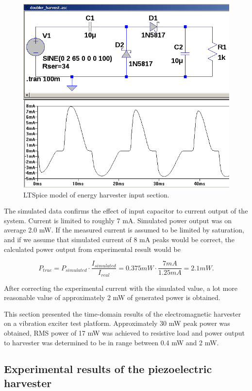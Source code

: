 \begin{figure}[htb]
\begin{center}
\includegraphics[height=10cm]{images/own_dwg/simulation/voltage_doubler.png}
\end{center}
\caption{\label{fig:simulated_doubler} LTSpice model of energy harvester input section.}
\end{figure}

The simulated data confirms the effect of input capacitor to current output of the system. Current is limited to roughly 7 mA. Simulated power output was on average 2.0 mW. If the measured current is assumed to be limited by saturation, and if we assume that simulated current of 8 mA peaks would be correct, the calculated power output from experimental result would be 

\begin{equation}
  P_{true} = P_{simulated} \cdot \frac{I_{simulated}}{I_{real}} = 0.375 mW \cdot \frac{7 mA}{1.25 mA} = 2.1 mW.
\end{equation}

After correcting the experimental current with the simulated value, a lot more reasonable value of approximately 2 mW of generated power is obtained. 

This section presented the time-domain results of the electromagnetic harvester on a vibration exciter test platform. Approximately 30 mW peak power was obtained, RMS power of 17 mW was achieved to resistive load and power output to harvester was determined to be in range between 0.4 mW and 2 mW. 

\subsection{Experimental results of the piezoelectric harvester}
